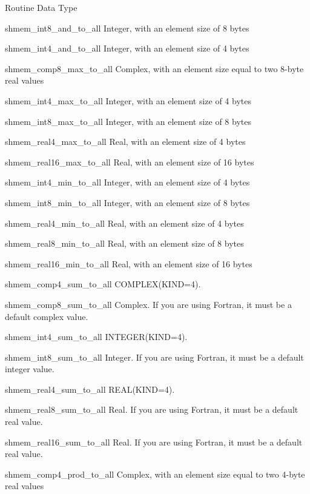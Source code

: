 		    Routine			  Data Type

		    shmem_int8_and_to_all	  Integer,  with  an   element
						  size of 8 bytes

		    shmem_int4_and_to_all	  Integer,   with  an  element
						  size of 4 bytes
						  
		    shmem_comp8_max_to_all	  Complex,   with  an  element
						  size	equal  to  two	8-byte
						  real values

		    shmem_int4_max_to_all	  Integer,   with  an  element
						  size of 4 bytes

		    shmem_int8_max_to_all	  Integer,  with  an   element
						  size of 8 bytes

		    shmem_real4_max_to_all	  Real,	 with  an element size
						  of 4 bytes

		    shmem_real16_max_to_all	  Real, with an	 element  size
						  of 16 bytes
						  
		    shmem_int4_min_to_all	  Integer,   with  an  element
						  size of 4 bytes

		    shmem_int8_min_to_all	  Integer,  with  an   element
						  size of 8 bytes

		    shmem_real4_min_to_all	  Real,	 with  an element size
						  of 4 bytes

		    shmem_real8_min_to_all	  Real, with an	 element  size
						  of 8 bytes

		    shmem_real16_min_to_all	  Real,	 with  an element size
						  of 16 bytes
						  
		    shmem_comp4_sum_to_all	 COMPLEX(KIND=4).

		   shmem_comp8_sum_to_all	 Complex.  If  you  are	 using
						 Fortran, it must be a default
						 complex value.

		   shmem_int4_sum_to_all	 INTEGER(KIND=4).

		   shmem_int8_sum_to_all	 Integer.  If  you  are	 using
						 Fortran, it must be a default
						 integer value.

		   shmem_real4_sum_to_all	 REAL(KIND=4).

		   shmem_real8_sum_to_all	 Real.	 If  you   are	 using
						 Fortran, it must be a default
						 real value.

		   shmem_real16_sum_to_all	 Real.	 If  you   are	 using
						 Fortran, it must be a default
						 real value.
						 
		   shmem_comp4_prod_to_all	  Complex,  with  an   element
						  size	equal  to  two	4-byte
						  real values

